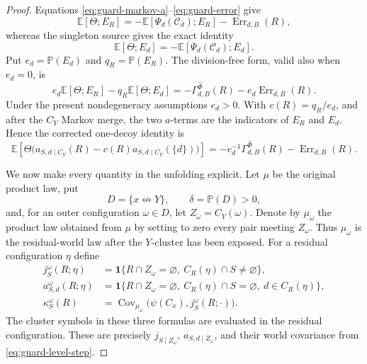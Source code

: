 \documentclass[11pt]{article}
\theoremstyle{definition}
\theoremstyle{remark}
\newcommand{\PP}{\mathbb P}
\newcommand{\EE}{\mathbb E}
\newcommand{\one}{\mathbf 1}
\newcommand{\cC}{\mathcal C}
\newcommand{\ncon}{\not\leftrightarrow}
\begin{document}
\begin{proof}
Equations \eqref{eq:guard-markov-a}--\eqref{eq:guard-error} give
\[
 \EE[\Theta;E_R]
 =-\EE[\Psi_d(\cC_d);E_R]-\operatorname{Err}_{d,B}(R),
\]
whereas the singleton source gives the exact identity
\begin{equation}\label{eq:guard-markov-d}
 \EE[\Theta;E_d]
 =-\EE[\Psi_d(\cC_d);E_d].
\end{equation}
Put $e_d=\PP(E_d)$ and $q_R=\PP(E_R)$.  The division-free form, valid
also when $e_d=0$, is
\begin{equation}\label{eq:guard-one-decoy-cross}
 e_d\EE[\Theta;E_R]-q_R\EE[\Theta;E_d]
 =-\Gamma_{d,B}^{\widehat\Phi}(R)
  -e_d\operatorname{Err}_{d,B}(R).
\end{equation}
Under the present nondegeneracy assumptions $e_d>0$.  With
$c(R)=q_R/e_d$, and after the $C_Y$ Markov merge, the two $a$-terms are
the indicators of $E_R$ and $E_d$.  Hence the corrected one-decoy
identity is
\begin{equation}\label{eq:guard-one-decoy}
 \EE\!\left[\Theta
   \bigl(a_{S,d\mid C_Y}(R)-c(R)a_{S,d\mid C_Y}(\{d\})\bigr)\right]
 =-e_d^{-1}\Gamma_{d,B}^{\widehat\Phi}(R)
  -\operatorname{Err}_{d,B}(R).
\end{equation}

We now make every quantity in the unfolding explicit.  Let $\mu$ be the
original product law, put
\[
 D=\{x\ncon Y\},\qquad \delta=\PP(D)>0,
\]
and, for an outer configuration $\omega\in D$, let
$Z_\omega=C_Y(\omega)$.  Denote by $\mu_\omega$ the product law obtained
from $\mu$ by setting to zero every pair meeting $Z_\omega$.  Thus
$\mu_\omega$ is the residual-world law after the $Y$-cluster has been
exposed.  For a residual configuration $\eta$ define
\begin{align*}
 j^\omega_S(R;\eta)
   &=\one\{R\cap Z_\omega=\varnothing,\ C_R(\eta)\cap S\ne\varnothing\},\\
 a^\omega_{S,d}(R;\eta)
   &=\one\{R\cap Z_\omega=\varnothing,\ C_R(\eta)\cap S=\varnothing,
                    \ d\in C_R(\eta)\},\\
 \kappa^\omega_S(R)
   &=\operatorname{Cov}_{\mu_\omega}
       \bigl(\psi(C_x),j^\omega_S(R;\mathord\cdot)\bigr).
\end{align*}
The cluster symbols in these three formulas are evaluated in the residual
configuration.  These are precisely $j_{S\mid Z_\omega}$,
$a_{S,d\mid Z_\omega}$, and their world covariance from
\eqref{eq:guard-level-step}.


\end{proof}
\end{document}
